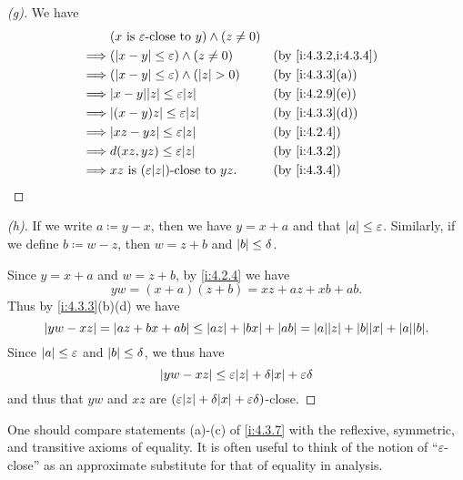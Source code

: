 \begin{proof}[(g)]
  We have
  \begin{align*}
             & (x \text{ is } \varepsilon\text{-close to } y) \land (z \neq 0)                           \\
    \implies & (\abs{x - y} \leq \varepsilon) \land (z \neq 0)                 &  & \by{i:4.3.2,i:4.3.4} \\
    \implies & (\abs{x - y} \leq \varepsilon) \land (\abs{z} > 0)              &  & \by{i:4.3.3}[a]      \\
    \implies & \abs{x - y} \abs{z} \leq \varepsilon \abs{z}                    &  & \by{i:4.2.9}[e]      \\
    \implies & \abs{(x - y)z} \leq \varepsilon \abs{z}                         &  & \by{i:4.3.3}[d]      \\
    \implies & \abs{xz - yz} \leq \varepsilon \abs{z}                          &  & \by{i:4.2.4}         \\
    \implies & d(xz, yz) \leq \varepsilon \abs{z}                              &  & \by{i:4.3.2}         \\
    \implies & xz \text{ is } (\varepsilon \abs{z})\text{-close to } yz.       &  & \by{i:4.3.4}
  \end{align*}
\end{proof}

\begin{proof}[(h)]
  If we write \(a \coloneqq y - x\), then we have \(y = x + a\) and that \(\left\lvert a\right\rvert \leq \varepsilon\).
  Similarly, if we define \(b \coloneqq w - z\), then \(w = z + b\) and \(\left\lvert b\right\rvert \leq \delta\).

  Since \(y = x + a\) and \(w = z + b\), by \cref{i:4.2.4} we have
  \[
    yw = (x + a)(z + b) = xz + az + xb + ab.
  \]
  Thus by \cref{i:4.3.3}(b)(d) we have
  \[
    \abs{yw - xz} = \abs{az + bx + ab} \leq \abs{az} + \abs{bx} + \abs{ab} = \abs{a}\abs{z} + \abs{b}\abs{x} + \abs{a}\abs{b}.
  \]
  Since \(\left\lvert a\right\rvert \leq \varepsilon\) and \(\left\lvert b\right\rvert \leq \delta\), we thus have
  \[
    \abs{yw - xz} \leq \varepsilon\abs{z} + \delta\abs{x} + \varepsilon\delta
  \]
  and thus that \(yw\) and \(xz\) are \((\varepsilon\abs{z} + \delta\abs{x} + \varepsilon\delta)\)-close.
\end{proof}

\begin{rmk}\label{i:4.3.8}
  One should compare statements (a)-(c) of \cref{i:4.3.7} with the reflexive, symmetric, and transitive axioms of equality.
  It is often useful to think of the notion of ``\(\varepsilon\)-close'' as an approximate substitute for that of equality in analysis.
\end{rmk}

